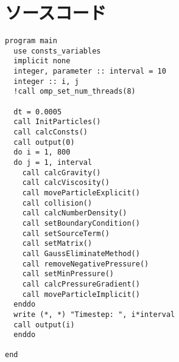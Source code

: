\appendix
\section{ソースコード}
\begin{lstlisting}[caption=メインプログラム]
program main
  use consts_variables
  implicit none
  integer, parameter :: interval = 10
  integer :: i, j
  !call omp_set_num_threads(8)

  dt = 0.0005
  call InitParticles()
  call calcConsts()
  call output(0)
  do i = 1, 800
  do j = 1, interval
    call calcGravity()
    call calcViscosity()
    call moveParticleExplicit()
    call collision()
    call calcNumberDensity()
    call setBoundaryCondition()
    call setSourceTerm()
    call setMatrix()
    call GaussEliminateMethod()
    call removeNegativePressure()
    call setMinPressure()
    call calcPressureGradient()
    call moveParticleImplicit()
  enddo
  write (*, *) "Timestep: ", i*interval
  call output(i)
  enddo

end
\end{lstlisting}






